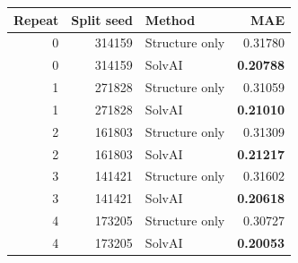\begin{tabular}{rrlr}
\toprule
Repeat & Split seed & Method & MAE \\
\midrule
0 & 314159 & Structure only & 0.31780 \\
0 & 314159 & SolvAI & \textbf{0.20788} \\
1 & 271828 & Structure only & 0.31059 \\
1 & 271828 & SolvAI & \textbf{0.21010} \\
2 & 161803 & Structure only & 0.31309 \\
2 & 161803 & SolvAI & \textbf{0.21217} \\
3 & 141421 & Structure only & 0.31602 \\
3 & 141421 & SolvAI & \textbf{0.20618} \\
4 & 173205 & Structure only & 0.30727 \\
4 & 173205 & SolvAI & \textbf{0.20053} \\
\bottomrule
\end{tabular}
